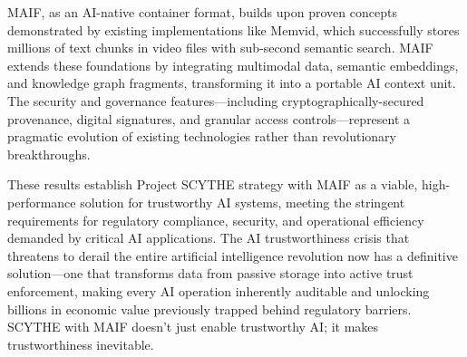 \documentclass[conference]{IEEEtran}
\begin{document}
MAIF, as an AI-native container format, builds upon proven concepts demonstrated by existing implementations like Memvid, which successfully stores millions of text chunks in video files with sub-second semantic search. MAIF extends these foundations by integrating multimodal data, semantic embeddings, and knowledge graph fragments, transforming it into a portable AI context unit. The security and governance features—including cryptographically-secured provenance, digital signatures, and granular access controls—represent a pragmatic evolution of existing technologies rather than revolutionary breakthroughs.


These results establish Project SCYTHE strategy with MAIF as a viable, high-performance solution for trustworthy AI systems, meeting the stringent requirements for regulatory compliance, security, and operational efficiency demanded by critical AI applications. The AI trustworthiness crisis that threatens to derail the entire artificial intelligence revolution now has a definitive solution—one that transforms data from passive storage into active trust enforcement, making every AI operation inherently auditable and unlocking billions in economic value previously trapped behind regulatory barriers. SCYTHE with MAIF doesn't just enable trustworthy AI; it makes trustworthiness inevitable.


\end{document}
